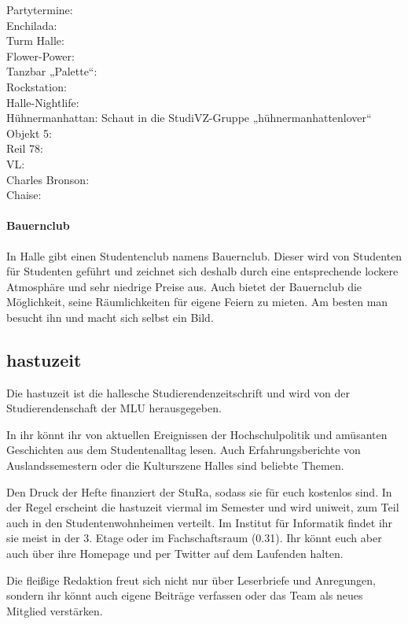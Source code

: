 Partytermine:  \\
Enchilada:  \\
Turm Halle:  \\
Flower-Power:  \\
Tanzbar „Palette“:  \\
Rockstation:  \\
Halle-Nightlife: \\
Hühnermanhattan: Schaut in die StudiVZ-Gruppe „hühnermanhattenlover“ \\
Objekt 5:  \\
Reil 78:  \\
VL: \\
Charles Bronson: \\
Chaise: 

\paragraph{Bauernclub}
In Halle gibt einen Studentenclub namens Bauernclub.
Dieser wird von Studenten für Studenten geführt und zeichnet sich deshalb durch eine entsprechende lockere Atmosphäre und sehr niedrige Preise aus.
Auch bietet der Bauernclub die Möglichkeit, seine Räumlichkeiten für eigene Feiern zu mieten.
Am besten man besucht ihn und macht sich selbst ein Bild.

        
\subsection{hastuzeit}
Die hastuzeit ist die hallesche Studierendenzeitschrift und wird von der Studierendenschaft der MLU herausgegeben.

In ihr könnt ihr von aktuellen Ereignissen der Hochschulpolitik und amüsanten Geschichten aus dem Studentenalltag lesen.
Auch Erfahrungsberichte von Auslandssemestern oder die Kulturszene Halles sind beliebte Themen.

Den Druck der Hefte finanziert der StuRa, sodass sie für euch kostenlos sind.
In der Regel erscheint die hastuzeit viermal im Semester und wird uniweit, zum Teil auch in den Studentenwohnheimen verteilt.
Im Institut für Informatik findet ihr sie meist in der 3. Etage oder im Fachschaftsraum (0.31).
Ihr könnt euch aber auch über ihre Homepage und per Twitter auf dem Laufenden halten.

Die fleißige Redaktion freut sich nicht nur über Leserbriefe und Anregungen, sondern ihr könnt auch eigene Beiträge verfassen oder das Team als neues Mitglied verstärken.

\\
\\



